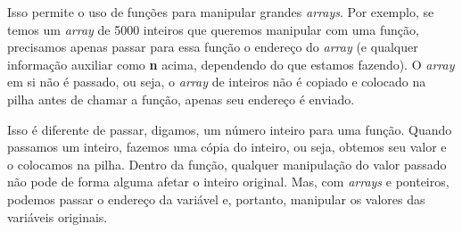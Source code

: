 Isso permite o uso de funções para manipular grandes \textit{arrays}. Por exemplo, se temos um \textit{array} de 5000 inteiros que queremos manipular com uma função, precisamos apenas passar para essa função o endereço do \textit{array} (e qualquer informação auxiliar como \textbf{n} acima, dependendo do que estamos fazendo). O \textit{array} em si não é passado, ou seja, o \textit{array} de inteiros não é copiado e colocado na pilha antes de chamar a função, apenas seu endereço é enviado.

Isso é diferente de passar, digamos, um número inteiro para uma função. Quando passamos um inteiro, fazemos uma cópia do inteiro, ou seja, obtemos seu valor e o colocamos na pilha. Dentro da função, qualquer manipulação do valor passado não pode de forma alguma afetar o inteiro original. Mas, com \textit{arrays} e ponteiros, podemos passar o endereço da variável e, portanto, manipular os valores das variáveis originais.

